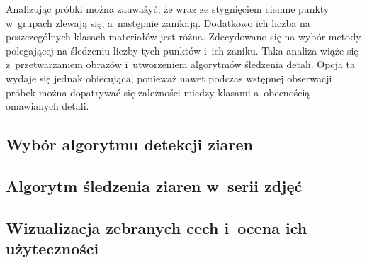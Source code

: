 Analizując próbki można zauważyć, że wraz ze stygnięciem ciemne punkty
w~grupach zlewają się, a~następnie zanikają.
Dodatkowo ich liczba na poszczególnych klasach materiałów jest różna.
Zdecydowano się na wybór metody polegającej na śledzeniu liczby tych punktów
i~ich zaniku.
Taka analiza wiąże się z~przetwarzaniem obrazów i~utworzeniem algorytmów
śledzenia detali.
Opcja ta wydaje się jednak obiecująca, ponieważ nawet podczas wstępnej
obserwacji próbek można dopatrywać się zależności miedzy klasami a~obecnością
omawianych detali.

\subsection{Wybór algorytmu detekcji ziaren}

\subsection{Algorytm śledzenia ziaren w~serii zdjęć}

\subsection{Wizualizacja zebranych cech i~ocena ich użyteczności}
